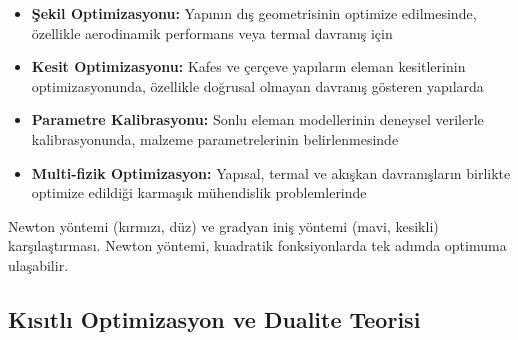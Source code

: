 \begin{itemize}
    \item \textbf{Şekil Optimizasyonu:} Yapının dış geometrisinin optimize edilmesinde, özellikle aerodinamik performans veya termal davranış için
    
    \item \textbf{Kesit Optimizasyonu:} Kafes ve çerçeve yapıların eleman kesitlerinin optimizasyonunda, özellikle doğrusal olmayan davranış gösteren yapılarda
    
    \item \textbf{Parametre Kalibrasyonu:} Sonlu eleman modellerinin deneysel verilerle kalibrasyonunda, malzeme parametrelerinin belirlenmesinde
    
    \item \textbf{Multi-fizik Optimizasyon:} Yapısal, termal ve akışkan davranışların birlikte optimize edildiği karmaşık mühendislik problemlerinde
\end{itemize}

\begin{marginfigure}
\centering
{}
\caption{Newton yöntemi (kırmızı, düz) ve gradyan iniş yöntemi (mavi, kesikli) karşılaştırması. Newton yöntemi, kuadratik fonksiyonlarda tek adımda optimuma ulaşabilir.}
\label{fig:newton_vs_gradient}
\end{marginfigure}

\subsection{Kısıtlı Optimizasyon ve Dualite Teorisi}

